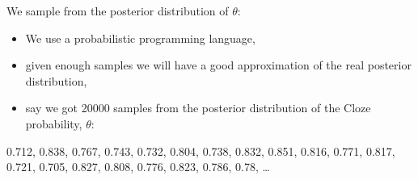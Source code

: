 \documentclass[12pt,ignorenonframetext,aspectratio=169]{beamer}
\providecommand{\tightlist}{%
  \setlength{\itemsep}{0pt}\setlength{\parskip}{0pt}}
\begin{document}
\begin{frame}

\begin{block}{We sample from the posterior distribution of \(\theta\):}

\begin{itemize}
\tightlist
\item
  We use a probabilistic programming language,
\item
  given enough samples we will have a good approximation of the real posterior distribution,
\item
  say we got 20000 samples from the posterior distribution of the Cloze probability, \(\theta\):
\end{itemize}

\scriptsize

0.712, 0.838, 0.767, 0.743, 0.732, 0.804, 0.738, 0.832, 0.851, 0.816, 0.771, 0.817, 0.721, 0.705, 0.827, 0.808, 0.776, 0.823, 0.786, 0.78, \ldots{}

\end{block}

\end{frame}

\end{document}
